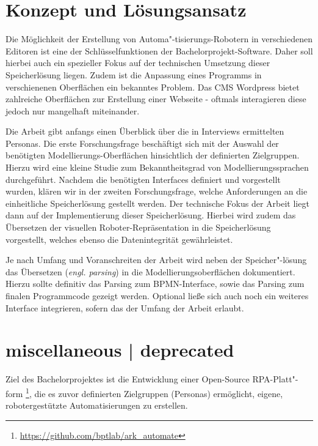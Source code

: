 \documentclass[a4paper, ngerman ]{article}
\begin{document}
\pagebreak

\section{Konzept und Lösungsansatz}

Die Möglichkeit der Erstellung von Automa"-tisierungs-Robotern in verschiedenen Editoren ist eine der Schlüsselfunktionen der Bachelorprojekt-Software. Daher soll hierbei auch ein spezieller Fokus auf der technischen Umsetzung dieser Speicherlösung liegen. Zudem ist die Anpassung eines Programms in verschienenen Oberflächen ein bekanntes Problem. Das CMS Wordpress bietet zahlreiche Oberflächen zur Erstellung einer Webseite - oftmals interagieren diese jedoch nur mangelhaft miteinander. 

Die Arbeit gibt anfangs einen Überblick über die in Interviews ermittelten Personas. Die erste Forschungsfrage beschäftigt sich mit der Auswahl der benötigten Modellierungs-Oberflächen hinsichtlich der definierten Zielgruppen. Hierzu wird eine kleine Studie zum Bekanntheitsgrad von Modellierungssprachen durchgeführt. Nachdem die benötigten Interfaces definiert und vorgestellt wurden, klären wir in der zweiten Forschungsfrage, welche Anforderungen an die einheitliche Speicherlösung gestellt werden. Der technische Fokus der Arbeit liegt dann auf der Implementierung dieser Speicherlösung. Hierbei wird zudem das Übersetzen der visuellen Roboter-Repräsentation in die Speicherlösung vorgestellt, welches ebenso die Datenintegrität gewährleistet. 

Je nach Umfang und Voranschreiten der Arbeit wird neben der Speicher"-lösung das Übersetzen (\textit{engl. parsing}) in die Modellierungsoberflächen dokumentiert. Hierzu sollte definitiv das Parsing zum BPMN-Interface, sowie das Parsing zum finalen Programmcode gezeigt werden. Optional ließe sich auch noch ein weiteres Interface integrieren, sofern das der Umfang der Arbeit erlaubt.

\section{miscellaneous | deprecated}
Ziel des Bachelorprojektes ist die Entwicklung einer Open-Source RPA-Platt"-form  \footnote{\url{https://github.com/bptlab/ark_automate}}, die es zuvor definierten Zielgruppen (Personas) ermöglicht, eigene, robotergestützte Automatisierungen zu erstellen.
\end{document}
